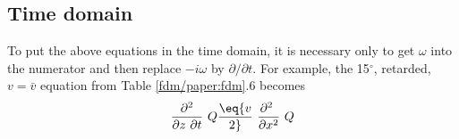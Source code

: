 {%
\subsection{Time domain}
\par
To put the above equations in the time domain, it is necessary only to
get  $ \omega $  into the numerator and
then replace  $ -i \omega $  by  $ \partial / \partial t $.
For example, the 15$^\circ$,  retarded, $ v  =  \bar v $  equation
from Table \ref{fdm/paper:fdm}.6 becomes
\begin{equation}
{ \partial^2   \over  \partial z \  \partial t } \  Q  \eq
{v \over 2 }\  { \partial^2 \    \over  \partial x^2 } \  Q
\label{eqn:one14}
\end{equation}
}
